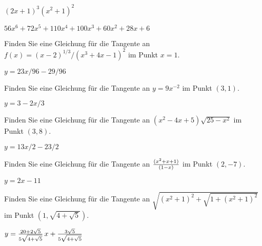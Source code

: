 \begin{exercises}
\begin{exercise} $(2x+1)^3(x^2+1)^2$
\begin{answer} $56x^6+72x^5+110x^4+100x^3+60x^2+28x+6$
\end{answer}\end{exercise}

\endtwocol

\begin{exercise}  Finden Sie eine Gleichung für die Tangente an 
$f(x) = (x-2)^{1/3}/(x^3 + 4x - 1)^2$ im Punkt  $x=1$.
\begin{answer} $y=23x/96-29/96$
\end{answer}\end{exercise}

\begin{exercise} Finden Sie eine Gleichung für die Tangente an  $y=9x^{-2}$ im Punkt $(3,1)$.
\begin{answer} $y=3-2x/3$
\end{answer}\end{exercise}

\begin{exercise} Finden Sie eine Gleichung für die Tangente an  $(x^2-4x+5)\sqrt{25-x^2}$ 
im Punkt $(3,8)$.
\begin{answer} $y=13x/2-23/2$
\end{answer}\end{exercise}

\begin{exercise} Finden Sie eine Gleichung für die Tangente an  ${(x^2+x+1)\over(1-x)}$ 
im Punkt $(2,-7)$.
\begin{answer} $y=2x-11$
\end{answer}\end{exercise}

\begin{exercise} Finden Sie eine Gleichung für die Tangente an  
$\sqrt{(x^2+1)^2+\sqrt{1+(x^2+1)^2}}$
im Punkt $(1,\sqrt{4+\sqrt{5}})$.
\begin{answer} $y=
{20+2\sqrt5\over5\sqrt{4+\sqrt5}}\,x+{3\sqrt5\over5\sqrt{4+\sqrt5}}$
\end{answer}\end{exercise}

\end{exercises}






















